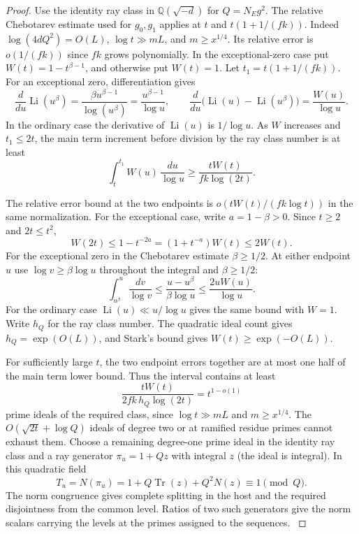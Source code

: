 \begin{proof}

Use the identity ray class in \(\mathbb Q(\sqrt{-d})\) for
\(Q=N_Eg^2\). The relative Chebotarev estimate used for \(g_0,g_1\)
applies at \(t\) and \(t(1+1/(fk))\). Indeed
\(\log(4dQ^2)=O(L)\), \(\log t\gg mL\), and \(m\ge x^{1/4}\).
Its relative error is \(o(1/(fk))\) since \(fk\) grows polynomially.
In the exceptional-zero case put \(W(t)=1-t^{\beta-1}\), and
otherwise put \(W(t)=1\). Let \(t_1=t(1+1/(fk))\). For an exceptional zero, differentiation gives
\[
 \frac{d}{du}\operatorname{Li}(u^\beta)
 =\frac{\beta u^{\beta-1}}{\log(u^\beta)}
 =\frac{u^{\beta-1}}{\log u},\qquad
 \frac{d}{du}\big(\operatorname{Li}(u)-\operatorname{Li}(u^\beta)\big)
 =\frac{W(u)}{\log u}.
\] In the ordinary case the derivative of
\(\operatorname{Li}(u)\) is \(1/\log u\). As \(W\) increases and
\(t_1\le2t\), the main term increment before division by the
ray class number is at least
\[
 \int_t^{t_1} W(u)\,\frac{du}{\log u}
       \ge \frac{tW(t)}{fk\log(2t)} .
\]

The relative error bound at the two endpoints is
\(o(tW(t)/(fk\log t))\) in the same normalization.
For the exceptional case, write \(a=1-\beta>0\). Since
\(t\ge2\) and \(2t\le t^2\),
\[
 W(2t)\le1-t^{-2a}=(1+t^{-a})W(t)\le2W(t).
\]
For the exceptional zero in the Chebotarev estimate \(\beta\ge1/2\).
At either endpoint \(u\) use \(\log v\ge\beta\log u\) throughout the integral and \(\beta\ge1/2\): 
\[
 \int_{u^\beta}^{u}\frac{dv}{\log v}\le\frac{u-u^\beta}{\beta\log u}\le\frac{2uW(u)}{\log u}.
\]
 For the ordinary
case \(\operatorname{Li}(u)\ll u/\log u\) gives the same bound
with \(W=1\).
Write \(h_Q\) for the ray class number. The quadratic ideal
count gives \(h_Q=\exp(O(L))\), and Stark's bound gives
\(W(t)\ge\exp(-O(L))\).

For sufficiently large \(t\), the
two endpoint errors together are at most one half of the
main term lower bound. Thus the interval contains at least
\[
 \frac{tW(t)}{2fk\,h_Q\log(2t)}=t^{1-o(1)}
\]
prime ideals of the required class, since
\(\log t\gg mL\) and \(m\ge x^{1/4}\).
The \(O(\sqrt{2t}+\log Q)\) ideals of degree two or at
ramified residue primes cannot exhaust them. Choose a remaining degree-one prime ideal in the identity ray
class and a ray generator \(\pi_u=1+Qz\) with integral \(z\)
(the ideal is integral). In this quadratic field
\[
 T_u=N(\pi_u)=1+Q\operatorname{Tr}(z)+Q^2N(z)\equiv1\pmod Q .
\]
The norm congruence gives complete splitting in the host and the
required disjointness from the common level. Ratios of two such
generators give the norm scalars carrying the levels at the primes assigned to the sequences.
\cite[Theorems 1.4 and 3.3]{tz-chebotarev}


\end{proof}
